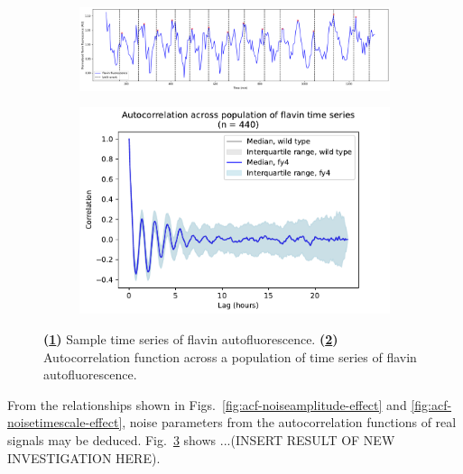 \begin{figure}
  \centering
  \begin{subfigure}[t]{0.6\textwidth}
  \centering
    \includegraphics[width=\linewidth]{26643_ts.png}
    \caption{
    }
    \label{fig:acf-sinusoid-biol-ts}
  \end{subfigure}%
  \begin{subfigure}[t]{0.4\textwidth}
  \centering
    \includegraphics[width=\linewidth]{fy4_26643_plots_06.png}
    \caption{
    }
    \label{fig:acf-sinusoid-biol-acf}
  \end{subfigure}

  \caption{
    \textbf{(\ref{fig:acf-sinusoid-biol-ts})}
    Sample time series of flavin autofluorescence.
    \textbf{(\ref{fig:acf-sinusoid-biol-acf})}
    Autocorrelation function across a population of time series of flavin autofluorescence.
  }
  \label{fig:acf-sinusoid-biol}
\end{figure}

From the relationships shown in Figs.\ \ref{fig:acf-noiseamplitude-effect} and \ref{fig:acf-noisetimescale-effect}, noise parameters from the autocorrelation functions of real signals may be deduced.
Fig.\ \ref{fig:acf-sinusoid-biol} shows ...(INSERT RESULT OF NEW INVESTIGATION HERE).


